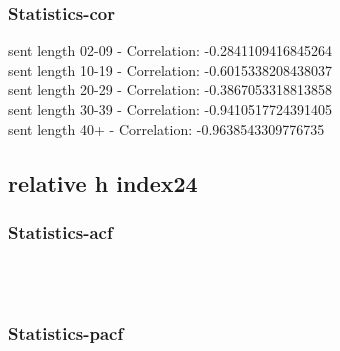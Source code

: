 \documentclass{article}%
\begin{document}
%
\newpage%
\subsubsection{Statistics{-}cor}%
\label{ssubsec:Statistics{-}cor}%
\noindent%
sent length 02-09 - Correlation: -0.2841109416845264\\%
sent length 10-19 - Correlation: -0.6015338208438037\\%
sent length 20-29 - Correlation: -0.3867053318813858\\%
sent length 30-39 - Correlation: -0.9410517724391405\\%
sent length 40+ - Correlation: -0.9638543309776735\\

%
\newpage

%
\subsection{relative h index24}%
\label{subsec:relativehindex24}%
\subsubsection{Statistics{-}acf}%
\label{ssubsec:Statistics{-}acf}%


\begin{figure}[ht]%
\centering%
\setlength{\abovecaptionskip}{-35pt}%
%
%
\\%
%
%
\\%
%
\end{figure}

%
\newpage%
\subsubsection{Statistics{-}pacf}%
\label{ssubsec:Statistics{-}pacf}%
\end{document}
